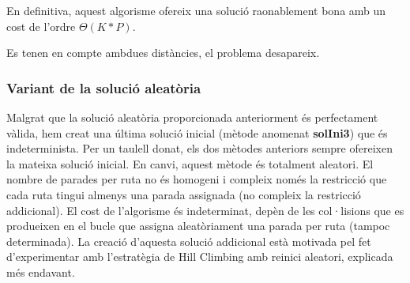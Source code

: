 En definitiva, aquest algorisme ofereix una solució raonablement bona amb un cost de l'ordre $\Theta(K * P)$.


 {Es tenen en compte ambdues distàncies, el problema desapareix.}

\subsubsection{Variant de la solució aleatòria}

Malgrat que la solució aleatòria proporcionada anteriorment és perfectament vàlida, hem creat una última solució inicial (mètode anomenat \textbf{solIni3}) que és indeterminista. Per un taulell donat, els dos mètodes anteriors sempre ofereixen la mateixa solució inicial. En canvi, aquest mètode és totalment aleatori. El nombre de parades per ruta no és homogeni i compleix només la restricció que cada ruta tingui almenys una parada assignada (no compleix la restricció addicional). El cost de l'algorisme és indeterminat, depèn de les col·lisions que es produeixen en el bucle que assigna aleatòriament una parada per ruta (tampoc determinada). La creació d'aquesta solució addicional està motivada pel fet d'experimentar amb l'estratègia de Hill Climbing amb reinici aleatori, explicada més endavant.

